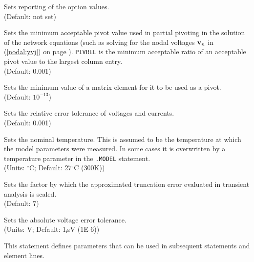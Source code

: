 \begin{widelist}
Sets reporting of the option values.
\\(Default: not set)

Sets the minimum acceptable pivot value used in partial pivoting
in the solution of the network equations
{(such as solving for the nodal
voltages ${\bf v}_n$ in (\ref{nodal:yvj}) on page \pageref{nodal:yvj})}.
{\tt PIVREL} is the minimum acceptable ratio of
an acceptable pivot value to the  largest  column entry.
\\(Default: 0.001)

Sets the minimum value of a matrix element for it to be used as a pivot.
\\(Default: $10^{-13}$)

Sets the relative error tolerance of voltages and currents.
\\(Default: 0.001)


Sets the nominal temperature.
This is assumed to be the temperature at which the model parameters were
measured.  In some cases it is overwritten by a temperature parameter in the
{\tt .MODEL} statement.
\\(Units: $^{\circ}$C; Default: 27$^{\circ}$C (300K))

Sets the factor by which the approximated truncation error evaluated
in transient analysis is scaled.
\\(Default: 7)

Sets the absolute voltage error tolerance.
\\(Units: V; Default: 1$\mu$V (1E-6))

\end{widelist}

%
%

This statement defines parameters that can be used in subsequent statements
and element lines.


